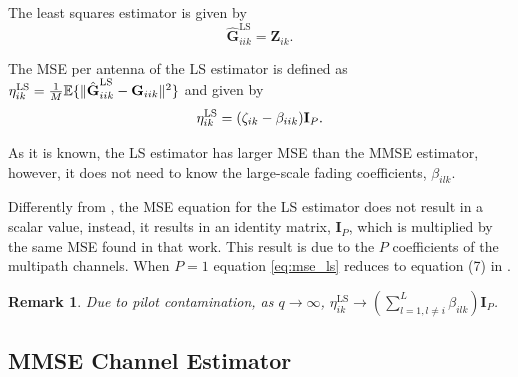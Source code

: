 \documentclass[journal,12pt,onecolumn]{IEEEtran}
\newtheorem{remark}{Remark}
\begin{document}
The least squares estimator is given by \cite{kay:estimationbook} 
\begin{equation}\label{eq:ls}
\hat{\textbf{G}}_{iik}^{\text{LS}} = \textbf{Z}_{ik}.
\end{equation}

The MSE per antenna of the LS estimator is defined as $\eta_{ik}^{\text{\text{LS}}} = \frac{1}{M} \mathbb{E} \{ \lVert  \hat{\textbf{G}}_{iik}^{\text{LS}} - \textbf{G}_{iik} \rVert^{2} \}$ and given by
\begin{equation}\label{eq:mse_ls}
\eta_{ik}^{\text{\text{LS}}} = (\zeta_{ik} - \beta_{iik}) \textbf{I}_{P}.
\end{equation}

As it is known, the LS estimator has larger MSE than the MMSE estimator, however, it does not need to know the large-scale fading coefficients, $\beta_{ilk}$.

Differently from \cite{Amin:channelEstPilotCont}, the MSE equation for the LS estimator does not result in a scalar value, instead, it results in an identity matrix, $ \textbf{I}_{P}$, which is multiplied by the same MSE found in that work. This result is due to the $P$ coefficients of the multipath channels. When $P = 1$ equation \eqref{eq:mse_ls} reduces to equation (7) in \cite{Amin:channelEstPilotCont}.

\begin{remark}Due to pilot contamination, as $q \to\infty $, $\eta_{ik}^{\text{LS}} \to \left( \sum_{l=1,l \neq i}^{L}{\beta_{ilk}} \right) \textbf{I}_{P}$. \end{remark}

\subsection{MMSE Channel Estimator}
\end{document}
